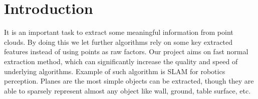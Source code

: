 \chapter{Introduction}

It is an important task to extract some meaningful information from point clouds. By doing this we let further algorithms rely on some key extracted features instead of using points as raw factors. Our project aims on fast normal extraction method, which can significantly increase the quality and speed of underlying algorithms. Example of such algorithm is SLAM for robotics perception. Planes are the most simple objects can be extracted, though they are able to sparsely represent almost any object like wall, ground, table surface, etc.
